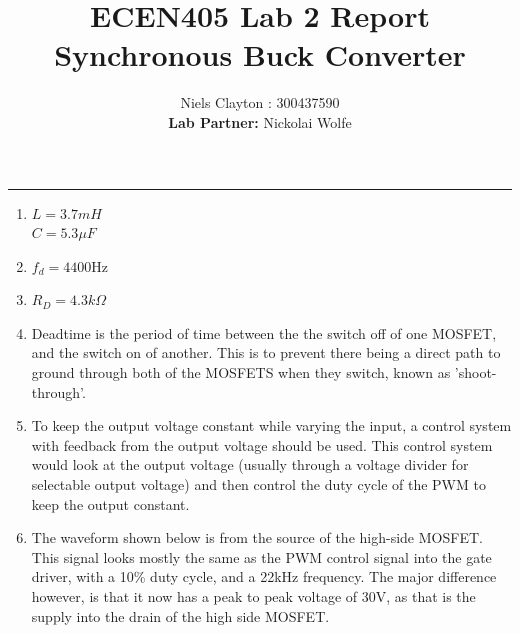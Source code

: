 \documentclass[a4paper,11pt]{article}
\begin{document}
\begin{preview}
\title{\LARGE{\textbf{ECEN405 Lab 2 Report\\Synchronous Buck Converter}}}
\author{Niels Clayton : 300437590\\\textbf{Lab Partner:} Nickolai Wolfe}
\date{}
\maketitle
\hrule

\begin{enumerate}

    \item $ L = 3.7mH $\\
    $ C = 5.3 \mu F $\\

    \item $f_d = 4400$Hz\\

    \item $R_D = 4.3k\Omega$\\
    
    \item Deadtime is the period of time between the the switch off of one MOSFET, and the switch on of another. This is to prevent there being a direct path to ground through both of the MOSFETS when they switch, known as 'shoot-through'.\\
    
    \item To keep the output voltage constant while varying the input, a control system with feedback from the output voltage should be used. This control system would look at the output voltage (usually through a voltage divider for selectable output voltage) and then control the duty cycle of the PWM to keep the output constant.\\

    \item The waveform shown below is from the source of the high-side MOSFET. This signal looks mostly the same as the PWM control signal into the gate driver, with a 10\% duty cycle, and a 22kHz frequency. The major difference however, is that it now has a peak to peak voltage of 30V, as that is the supply into the drain of the high side MOSFET. 


\end{enumerate}
\end{preview}
\end{document}
